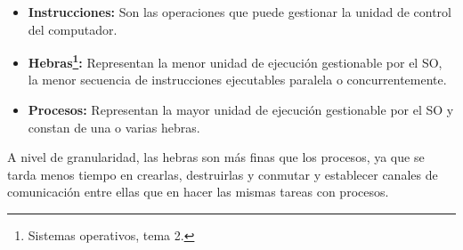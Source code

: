 \begin{itemize}
	\item\textbf{Instrucciones:} Son las operaciones que puede gestionar la unidad de control del computador.
	\item\textbf{Hebras\footnote{Sistemas operativos, tema 2.}:} Representan la menor unidad de ejecución gestionable por el SO, la menor secuencia de instrucciones ejecutables paralela o concurrentemente.
	\item\textbf{Procesos:} Representan la mayor unidad de ejecución gestionable por el SO y constan de una o varias hebras.
\end{itemize}

A nivel de granularidad, las hebras son más finas que los procesos, ya que se tarda menos tiempo en crearlas, destruirlas y conmutar y establecer canales de comunicación entre ellas que en hacer las mismas tareas con procesos.

